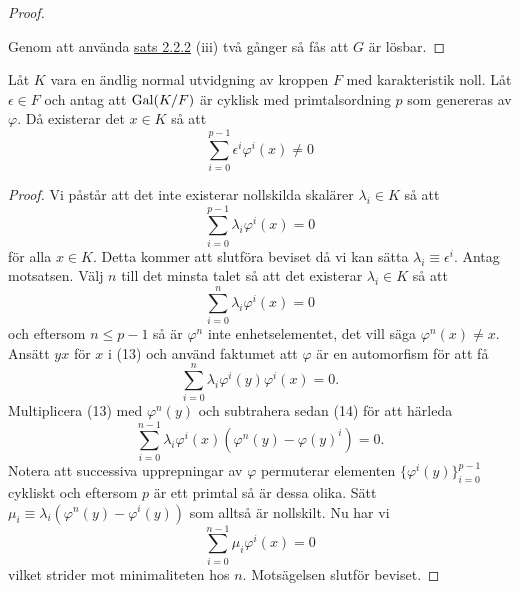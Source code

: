 \documentclass{article}
\newcommand{\gal}[0]{\textnormal{Gal}}
\theoremstyle{definition}
\begin{document}
\begin{proof}
  \begin{center}
    \newcommand{\mydistance}{.6cm}
  \end{center}  
  Genom att använda \hyperlink{sats3.2.2}{sats 2.2.2} (iii) två gånger så fås att $G$ är lösbar. 
\end{proof}

\hypertarget{lemma10.0.5}{}
\begin{mylemma}{}{}
  Låt $K$ vara en ändlig normal utvidgning av kroppen $F$ med karakteristik noll. Låt $\epsilon \in F$ och antag att $\gal(K/F)$ är cyklisk med primtalsordning $p$
  som genereras av $\varphi$. Då existerar det $x \in K$ så att 
  \[ \sum_{i = 0}^{p-1} \epsilon^i \varphi^i(x) \neq 0 \]
\end{mylemma}

\begin{proof}
  Vi påstår att det inte existerar nollskilda skalärer $\lambda_i \in K$ så att 
  \[\sum_{i = 0}^{p-1} \lambda_i \varphi^i(x) = 0\]
  för alla $x \in K$. Detta kommer att slutföra beviset då vi kan sätta $\lambda_i \equiv \epsilon^i$.
  Antag motsatsen. Välj $n$ till det minsta talet så att det existerar $\lambda_i \in K$ så att 
  \begin{equation}
    \sum_{i = 0}^{n} \lambda_i \varphi^i(x) = 0
  \end{equation}
  och eftersom $n \leq p-1$ så är $\varphi^n$ inte enhetselementet, det vill säga $\varphi^n(x) \neq x$.
  Ansätt $yx$ för $x$ i (13) och använd faktumet att $\varphi$ är en automorfism för att få 
  \begin{equation}
    \sum_{i = 0}^{n} \lambda_i \varphi^i(y)\varphi^i(x) = 0.
  \end{equation}
  Multiplicera (13) med $\varphi^n(y)$ och subtrahera sedan (14) för att härleda 
  \[\sum_{i = 0}^{n-1} \lambda_i \varphi^i(x) (\varphi^n(y) - \varphi(y)^i) = 0. \]
  Notera att successiva upprepningar av $\varphi$ permuterar elementen 
  $\{\varphi^i(y)\}_{i = 0}^{p-1}$
  cykliskt och eftersom $p$ är ett primtal så är dessa olika.
  Sätt $\mu_i \equiv \lambda_i(\varphi^n(y) - \varphi^i(y))$ som alltså är nollskilt.
  Nu har vi 
  \[\sum_{i = 0}^{n-1} \mu_i\varphi^i(x) = 0 \]
  vilket strider mot minimaliteten hos $n$. Motsägelsen slutför beviset.
\end{proof}
\end{document}
